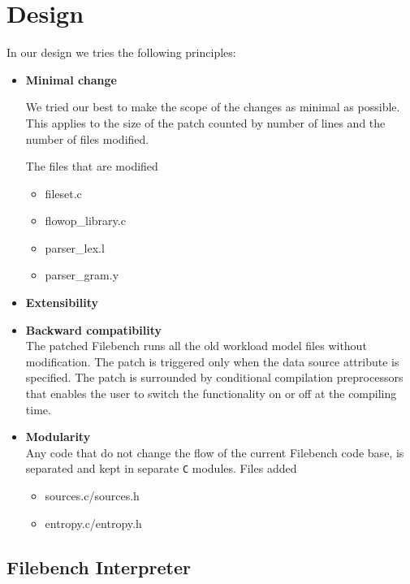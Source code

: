 \chapter{Design}\label{chap:des}

In our design we tries the following principles:

\begin{itemize}

\item \textbf{Minimal change} %

We tried our best to make the scope of the changes as minimal as possible. This applies to the size of the patch counted by number of lines 
and the number of files modified. 

The files that are modified
\begin{itemize}
\item fileset.c
\item flowop\_library.c
\item parser\_lex.l
\item parser\_gram.y
\end{itemize} 

\item \textbf{Extensibility} \\

\item \textbf{Backward compatibility} \\
The patched Filebench runs all the old workload model files without modification. The patch is triggered only when the data source attribute is specified. The patch is surrounded by conditional compilation preprocessors that enables the user to switch the functionality on or off at the compiling time.

\item \textbf{Modularity}\\
Any code that do not change the flow of the current Filebench code base, is separated and kept in separate \verb+C+ modules.
 Files added
\begin{itemize}
\item sources.c/sources.h 
\item entropy.c/entropy.h
\end{itemize}

\end{itemize}



\section{Filebench Interpreter}

